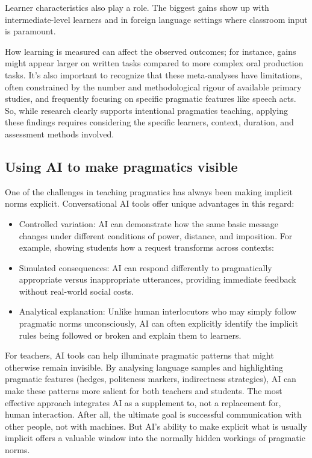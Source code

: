 Learner characteristics also play a role. The biggest gains show up with intermediate-level learners and in foreign language settings where classroom input is paramount.

How learning is measured can affect the observed outcomes; for instance, gains might appear larger on written tasks compared to more complex oral production tasks. It's also important to recognize that these meta-analyses have limitations, often constrained by the number and methodological rigour of available primary studies, and frequently focusing on specific pragmatic features like speech acts. So, while research clearly supports intentional pragmatics teaching, applying these findings requires considering the specific learners, context, duration, and assessment methods involved.

\subsection{Using AI to make pragmatics visible}

One of the challenges in teaching pragmatics has always been making implicit norms explicit. Conversational AI tools offer unique advantages in this regard:
\begin{itemize}[noitemsep]
\item Controlled variation: AI can demonstrate how the same basic message changes under different conditions of power, distance, and imposition. For example, showing students how a request transforms across contexts:
\ea
   \z
\z
\item Simulated consequences: AI can respond differently to pragmatically appropriate versus inappropriate utterances, providing immediate feedback without real-world social costs.

\item Analytical explanation: Unlike human interlocutors who may simply follow pragmatic norms unconsciously, AI can often explicitly identify the implicit rules being followed or broken and explain them to learners.

\end{itemize}
For teachers, AI tools can help illuminate pragmatic patterns that might otherwise remain invisible. By analysing language samples and highlighting pragmatic features (hedges, politeness markers, indirectness strategies), AI can make these patterns more salient for both teachers and students.
The most effective approach integrates AI as a supplement to, not a replacement for, human interaction. After all, the ultimate goal is successful communication with other people, not with machines. But AI's ability to make explicit what is usually implicit offers a valuable window into the normally hidden workings of pragmatic norms.

